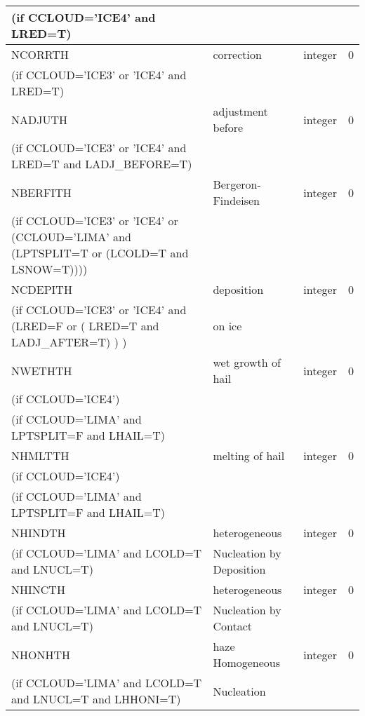 \begin{longtable} {|p{}|p{}|>{\centering}p{}|p{}<{\centering}|}
(if CCLOUD='ICE4' and LRED=T) & &   &  \\\hline
NCORRTH  & correction          & integer  &  0 \index{NCORRTH!\innam{NAM\_BU\_RTH}}\\ \nopagebreak
(if CCLOUD='ICE3' or 'ICE4' and LRED=T) & &   &  \\\hline
NADJUTH  & adjustment before          & integer  &  0 \index{NADJUTH!\innam{NAM\_BU\_RTH}}\\ \nopagebreak
(if CCLOUD='ICE3' or 'ICE4' and LRED=T and LADJ\_BEFORE=T) & &   &  \\\hline
NBERFITH  & Bergeron-Findeisen   & integer  &  0 \index{NBERFITH!\innam{NAM\_BU\_RTH}}\\ \nopagebreak
(if CCLOUD='ICE3' or 'ICE4' or (CCLOUD='LIMA' and (LPTSPLIT=T or (LCOLD=T and LSNOW=T)))) & &   &  \\\hline
NCDEPITH  & deposition  & integer  &  0 \index{NCDEPITH!\innam{NAM\_BU\_RTH}}\\ \nopagebreak
(if CCLOUD='ICE3' or 'ICE4' and (LRED=F or ( LRED=T and LADJ\_AFTER=T) ) ) & on ice   & & \\\hline
NWETHTH   & wet growth of hail   & integer  &  0 \index{NWETHTH!\innam{NAM\_BU\_RTH}}\\ \nopagebreak
(if CCLOUD='ICE4')   &  &        &   \\ \nopagebreak
(if CCLOUD='LIMA' and LPTSPLIT=F and LHAIL=T)   &  &        &   \\\hline
NHMLTTH   & melting of hail      & integer  &  0 \index{NHMLTTH!\innam{NAM\_BU\_RTH}}\\ \nopagebreak
(if CCLOUD='ICE4')   &   &       &   \\ \nopagebreak
(if CCLOUD='LIMA' and LPTSPLIT=F and LHAIL=T)   &  &        &   \\\hline
NHINDTH   & heterogeneous & integer  &  0 \index{NHINDTH!\innam{NAM\_BU\_RTH}}\\ \nopagebreak
(if CCLOUD='LIMA' and LCOLD=T and LNUCL=T)   &Nucleation by Deposition   &       &   \\\hline
NHINCTH   & heterogeneous & integer  &  0 \index{NHINCTH!\innam{NAM\_BU\_RTH}}\\ \nopagebreak
(if CCLOUD='LIMA' and LCOLD=T and LNUCL=T)   & Nucleation by Contact  &       &   \\\hline
NHONHTH   & haze Homogeneous       & integer  &  0 \index{NHONHTH!\innam{NAM\_BU\_RTH}}\\ \nopagebreak
(if CCLOUD='LIMA' and LCOLD=T and LNUCL=T and LHHONI=T)   &   Nucleation&       &   \\\hline

\end{longtable}
